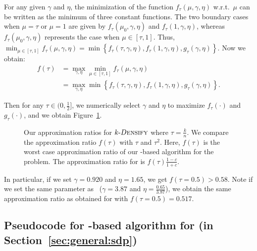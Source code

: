 For any given $\gamma$ and $\eta$, the minimization of the function
$f_{\tau}(\mu, \gamma, \eta)$ w.r.t.\ $\mu$ can be written as the minimum of three constant functions. 
The two boundary cases when $\mu = \tau$ or $\mu = 1$ are given by 
$f_{\tau}(\mu_0, \gamma, \eta)$ and $f_{\tau}(1, \gamma, \eta)$, whereas
$f_{\tau}(\mu_0, \gamma, \eta)$ represents the case when $\mu \in [\tau, 1]$. 
Thus, 
$\min_{\mu \in [\tau, 1]}f_{\tau}(\mu, \gamma, \eta) = \min \left\{f_{\tau}(\tau, \gamma, \eta), f_{\tau}(1, \gamma, \eta), g_{\tau}(\gamma, \eta)\right\}$. 
Now we obtain:
\begin{equation*}
	\begin{aligned}
f(\tau) &= \max_{\gamma, \eta} \min_{\mu \in [\tau, 1]}f_{\tau}(\mu, \gamma, \eta)  \\
&= \max_{\gamma, \eta} \min \left\{f_{\tau}(\tau, \gamma, \eta), f_{\tau}(1, \gamma, \eta), g_{\tau}(\gamma, \eta)\right\}.
	\end{aligned}
\end{equation*}

Then for any $\tau \in (0, \frac{1}{2}]$, we numerically select $\gamma$ and $\eta$ to maximize $f_{\tau}(\cdot)$ and $g_{\tau}(\cdot)$, and we obtain Figure~\ref{fig:dense-ratio}. 

\begin{figure}
\centering
{}
\caption{Our approximation ratios for $k\text{-}{{\small D}\textsc{ensify}}$ where $\tau = \frac{k}{n}$. We compare the approximation ratio $f(\tau)$ with $\tau$ and $\tau^2$.
Here, $f(\tau)$ is the worst case approximation ratio of our \sdp-based
algorithm for the \kdense problem. The approximation ratio for \dskc is $f(\tau) \frac{1-c}{1+c}$.}
\label{fig:dense-ratio}
\end{figure}

In particular, if we set $\gamma = 0.920$ and $\eta = 1.65$, we get $f(\tau = 0.5) > 0.58$. 
Note if we set the same parameter as~\cite{DBLP:journals/jal/feigel01} ($\gamma
	= 3.87$ and $\eta = \frac{0.65}{3.87}$), we obtain the same approximation
ratio as \cite{DBLP:journals/jal/feigel01} obtained for \dks with $f(\tau = 0.5) = 0.517$. 

\subsection{Pseudocode for {\sdp}-based algorithm for \maxcutkc (in Section~\ref{sec:general:sdp})}
\label{appendix:maxcutkc:sdp:pseudocode}

